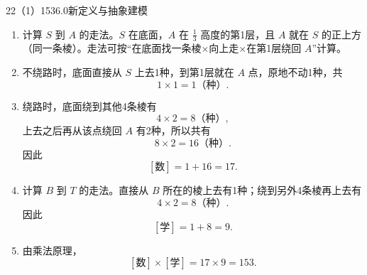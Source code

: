 \begin{solution}{22（1）}{153}{6.0}{新定义与抽象建模}
\begin{enumerate}[label=\textbf{Step \arabic*:},leftmargin=*]
  \item 计算 \(S\) 到 \(A\) 的走法。\(S\) 在底面，\(A\) 在 \(\frac13\) 高度的第1层，且 \(A\) 就在 \(S\) 的正上方（同一条棱）。走法可按“在底面找一条棱\(\times\)向上走\(\times\)在第1层绕回 \(A\)”计算。
  \item 不绕路时，底面直接从 \(S\) 上去1种，到第1层就在 \(A\) 点，原地不动1种，共
  \[
    1\times1=1\text{（种）}.
  \]
  \item 绕路时，底面绕到其他4条棱有
  \[
    4\times2=8\text{（种）},
  \]
  上去之后再从该点绕回 \(A\) 有2种，所以共有
  \[
    8\times2=16\text{（种）}.
  \]
  因此
  \[
    [\text{数}]=1+16=17.
  \]
  \item 计算 \(B\) 到 \(T\) 的走法。直接从 \(B\) 所在的棱上去有1种；绕到另外4条棱再上去有
  \[
    4\times2=8\text{（种）}.
  \]
  因此
  \[
    [\text{学}]=1+8=9.
  \]
  \item 由乘法原理，
  \[
    [\text{数}]\times[\text{学}]=17\times9=153.
  \]
\end{enumerate}
\end{solution}


